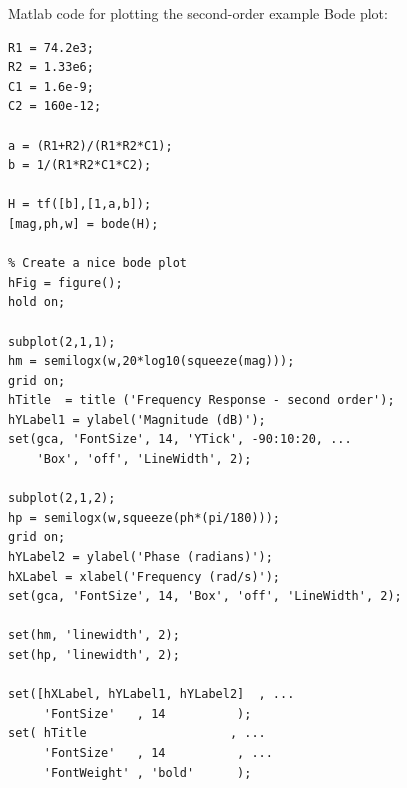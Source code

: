 \newpage
Matlab code for plotting the second-order example Bode plot:
\begin{verbatim}
R1 = 74.2e3;
R2 = 1.33e6;
C1 = 1.6e-9;
C2 = 160e-12;

a = (R1+R2)/(R1*R2*C1);
b = 1/(R1*R2*C1*C2);

H = tf([b],[1,a,b]);
[mag,ph,w] = bode(H);

% Create a nice bode plot 
hFig = figure();
hold on;

subplot(2,1,1);
hm = semilogx(w,20*log10(squeeze(mag)));
grid on;
hTitle  = title ('Frequency Response - second order');
hYLabel1 = ylabel('Magnitude (dB)');
set(gca, 'FontSize', 14, 'YTick', -90:10:20, ...
    'Box', 'off', 'LineWidth', 2);

subplot(2,1,2);
hp = semilogx(w,squeeze(ph*(pi/180)));
grid on;
hYLabel2 = ylabel('Phase (radians)');
hXLabel = xlabel('Frequency (rad/s)');
set(gca, 'FontSize', 14, 'Box', 'off', 'LineWidth', 2);

set(hm, 'linewidth', 2);
set(hp, 'linewidth', 2);

set([hXLabel, hYLabel1, hYLabel2]  , ...
     'FontSize'   , 14          );
set( hTitle                    , ...
     'FontSize'   , 14          , ...
     'FontWeight' , 'bold'      );
\end{verbatim}
